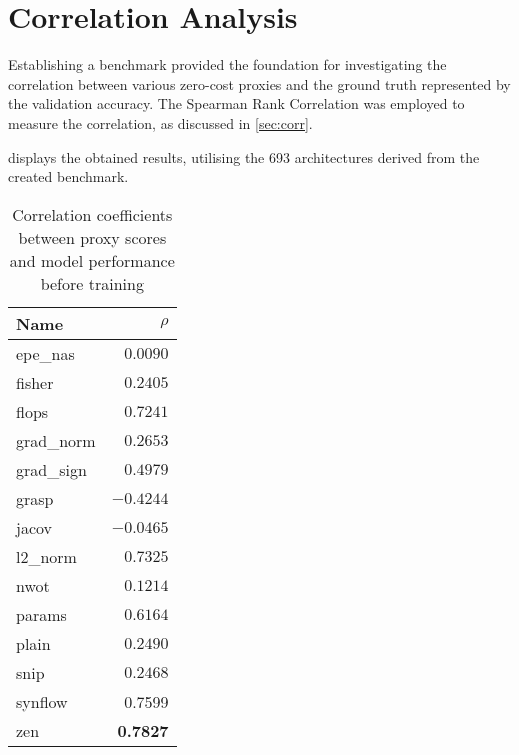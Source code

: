\section{Correlation Analysis}\label{res:correlation}

Establishing a benchmark provided the foundation for investigating the correlation between various zero-cost proxies and the ground truth represented by the validation accuracy. The Spearman Rank Correlation was employed to measure the correlation, as discussed in \cref{sec:corr}. 

 displays the obtained results, utilising the 693 architectures derived from the created benchmark. 
\clearpage

\begin{table}[h]
\caption{Correlation coefficients between proxy scores and model performance before training}
\centering
\begin{tabular}{lr}
\textbf{Name} & \textbf{$\rho$} \\ \hline
\multicolumn{1}{l|}{\cellcolor{verylightgray}epe\_nas} & \cellcolor{verylightgray}$0.0090$ \\
\multicolumn{1}{l|}{fisher} & $0.2405$ \\
\multicolumn{1}{l|}{\cellcolor{verylightgray}flops} & \cellcolor{verylightgray}$0.7241$ \\
\multicolumn{1}{l|}{grad\_norm} & $0.2653$ \\
\multicolumn{1}{l|}{\cellcolor{verylightgray}grad\_sign} & \cellcolor{verylightgray}$0.4979$ \\
\multicolumn{1}{l|}{grasp} & $-0.4244$ \\
\multicolumn{1}{l|}{\cellcolor{verylightgray}jacov} & \cellcolor{verylightgray}$-0.0465$ \\
\multicolumn{1}{l|}{l2\_norm} & $0.7325$ \\
\multicolumn{1}{l|}{\cellcolor{verylightgray}nwot} & \cellcolor{verylightgray}$0.1214$ \\
\multicolumn{1}{l|}{params} & $0.6164$ \\
\multicolumn{1}{l|}{\cellcolor{verylightgray}plain} & \cellcolor{verylightgray}$0.2490$ \\
\multicolumn{1}{l|}{snip} & $0.2468$ \\
\multicolumn{1}{l|}{\cellcolor{verylightgray}synflow} & \cellcolor{verylightgray}0.7599 \\
\multicolumn{1}{l|}{zen} & \textbf{0.7827} \\
\end{tabular}
\label{tab:corr}
\end{table}




